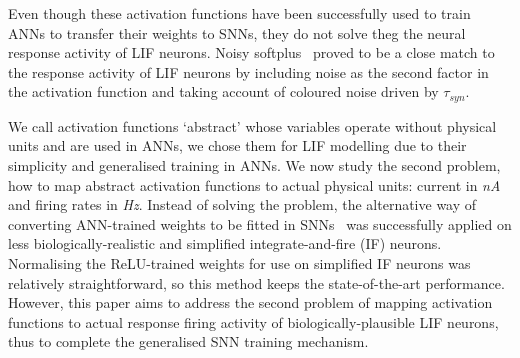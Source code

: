 \documentclass{article}
\begin{document}
Even though these activation functions have been successfully used to train ANNs to transfer their weights to SNNs, they do not solve theg the neural response activity of LIF neurons. %
Noisy softplus~\cite{liu2016noisy} proved to be a close match to the response activity of LIF neurons by including noise as the second factor in the activation function and taking account of coloured noise driven by $\tau_{syn}$.

We call activation functions `abstract' whose variables operate without physical units and are used in ANNs, we chose them for LIF modelling due to their simplicity and generalised training in ANNs. 
We now study the second problem, how to map abstract activation functions to actual physical units: current in \textit{nA} and firing rates in \textit{Hz}.
Instead of solving the problem, the alternative way of converting ANN-trained weights to be fitted in SNNs~\cite{cao2015spiking,diehl2015fast} was successfully applied 
on less biologically-realistic and simplified integrate-and-fire (IF) neurons.
Normalising the ReLU-trained weights for use on simplified IF neurons was relatively straightforward, so this method keeps the state-of-the-art performance.
However, this paper aims to address the second problem of mapping activation functions to actual response firing activity of biologically-plausible LIF neurons, thus to complete the generalised SNN training mechanism.



\end{document}
